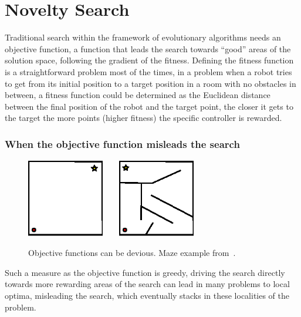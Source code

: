 \section{Novelty Search}

Traditional search within the framework of evolutionary algorithms needs an objective function, a function that leads the search towards ``good'' areas of the solution space, following the gradient of the fitness. Defining the fitness function is a straightforward problem most of the times, in a problem when a robot tries to get from its initial position to a target position in a room with no obstacles in between, a fitness function could be determined as the Euclidean distance between the final position of the robot and the target point, the closer it gets to the target the more points (higher fitness) the specific controller is rewarded.

\subsubsection*{When the objective function misleads the search}

\begin{figure}[t!]
\centering
\includegraphics[width=0.3\textwidth]{../Figures/Misc/mazeEasy.eps}\  \ \   \   
\includegraphics[width=0.3\textwidth]{../Figures/Misc/maze.eps}
\caption{Objective functions can be devious. Maze example from~\cite{lehman2011abandoning}.}
\label{fig:maze}
\end{figure}

Such a measure as the objective function is greedy, driving the search directly towards more rewarding areas of the search can lead  in many problems to local optima, misleading the search, which eventually stacks in these localities of the problem. 

